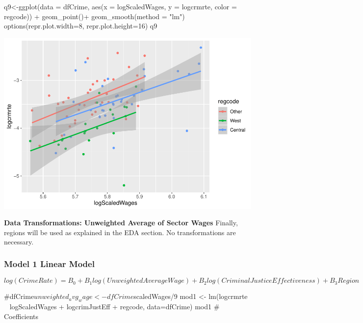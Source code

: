 \documentclass[]{article}
\newenvironment{Shaded}{}{}
\newcommand{\CommentTok}[1]{\textcolor[rgb]{0.00,0.50,0.00}{#1}}
\newcommand{\DataTypeTok}[1]{#1}
\newcommand{\DecValTok}[1]{#1}
\newcommand{\KeywordTok}[1]{\textcolor[rgb]{0.00,0.00,1.00}{#1}}
\newcommand{\NormalTok}[1]{#1}
\newcommand{\OperatorTok}[1]{#1}
\newcommand{\StringTok}[1]{\textcolor[rgb]{0.00,0.50,0.50}{#1}}
\begin{document}
\begin{Shaded}
\begin{Highlighting}[]
\NormalTok{q9<-}\KeywordTok{ggplot}\NormalTok{(}\DataTypeTok{data =}\NormalTok{ dfCrime, }\KeywordTok{aes}\NormalTok{(}\DataTypeTok{x =}\NormalTok{ logScaledWages, }\DataTypeTok{y =}\NormalTok{ logcrmrte, }\DataTypeTok{color =}\NormalTok{ regcode)) }\OperatorTok{+}\StringTok{ }
\StringTok{      }\KeywordTok{geom_point}\NormalTok{()}\OperatorTok{+}
\StringTok{  }\KeywordTok{geom_smooth}\NormalTok{(}\DataTypeTok{method =} \StringTok{"lm"}\NormalTok{)}
\KeywordTok{options}\NormalTok{(}\DataTypeTok{repr.plot.width=}\DecValTok{8}\NormalTok{, }\DataTypeTok{repr.plot.height=}\DecValTok{16}\NormalTok{)}
\NormalTok{q9}
\end{Highlighting}
\end{Shaded}

\includegraphics{Bagnard_Gaustad_Hartman_Leung_Lab_3_files/figure-latex/unnamed-chunk-59-1.pdf}

\textbf{Data Transformations: Unweighted Average of Sector Wages}
Finally, regions will be used as explained in the EDA section. No
transformations are necessary.

\hypertarget{model-1-linear-model}{%
\subsubsection{Model 1 Linear Model}\label{model-1-linear-model}}

\[ log(Crime Rate) = B_0 + B_1log(Unweighted Average Wage) + B_2log(Criminal Justice Effectiveness) + B_3Region\]

\begin{Shaded}
\begin{Highlighting}[]
\CommentTok{#dfCrime$unweighted_avg_wage <- dfCrime$scaledWages/9}
\NormalTok{mod1 <-}\StringTok{ }\KeywordTok{lm}\NormalTok{(logcrmrte }\OperatorTok{~}\StringTok{ }\NormalTok{logScaledWages }\OperatorTok{+}\StringTok{ }\NormalTok{logcrimJustEff }\OperatorTok{+}\StringTok{ }\NormalTok{regcode, }\DataTypeTok{data=}\NormalTok{dfCrime)}
\NormalTok{mod1 }\CommentTok{# Coefficients}
\end{Highlighting}
\end{Shaded}
\end{document}
